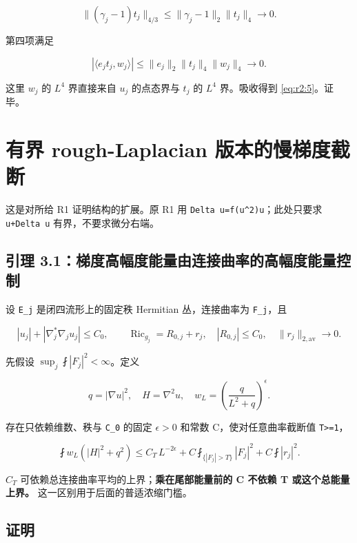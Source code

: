 \documentclass[UTF8,11pt,fontset=none]{ctexart}
\begin{document}
\[
 \|(\gamma_j-1)t_j\|_{4/3}
 \le\|\gamma_j-1\|_2\|t_j\|_4\to0.
\]

第四项满足

\[
 |\langle e_jt_j,w_j\rangle|
 \le\|e_j\|_2\|t_j\|_4\|w_j\|_4\to0.
\]

这里 \(w_j\) 的 \(L^4\) 界直接来自 \(u_j\) 的点态界与 \(t_j\) 的 \(L^4\) 界。吸收得到 \eqref{eq:r2:5}。证毕。

\section{有界 rough-Laplacian 版本的慢梯度截断}\label{ch2:ux6709ux754c-rough-laplacian-ux7248ux672cux7684ux6162ux68afux5ea6ux622aux65ad}

这是对所给 R1 证明结构的扩展。原 R1 用 \texttt{Delta\ u=f(\textbar{}u\textbar{}\^{}2)u}；此处只要求 \texttt{\textbar{}u\textbar{}+\textbar{}Delta\ u\textbar{}} 有界，不要求微分右端。

\subsection{引理 3.1：梯度高幅度能量由连接曲率的高幅度能量控制}\label{ch2:ux5f15ux7406-3.1ux68afux5ea6ux9ad8ux5e45ux5ea6ux80fdux91cfux7531ux8fdeux63a5ux66f2ux7387ux7684ux9ad8ux5e45ux5ea6ux80fdux91cfux63a7ux5236}

设 \texttt{E\_j} 是闭四流形上的固定秩 Hermitian 丛，连接曲率为 \texttt{F\_j}，且

\[
 |u_j|+|\nabla_j^*\nabla_j u_j|\le C_0,\qquad
 \operatorname{Ric}_{g_j}=R_{0,j}+r_j,\quad |R_{0,j}|\le C_0,\quad
 \|r_j\|_{2,\mathrm{av}}\to0.
 \tag{2.11}\label{eq:r2:11}
\]

先假设 \(\sup_j\fint|F_j|^2<\infty\)。定义

\[
 q=|\nabla u|^2,\quad H=\nabla^2u,\quad
 w_L=\left(\frac q{L^2+q}\right)^\epsilon.
\]

存在只依赖维数、秩与 \texttt{C\_0} 的固定 \(\epsilon>0\) 和常数 C，使对任意曲率截断值 \texttt{T\textgreater{}=1}，

\[
 \boxed{
 \fint w_L(|H|^2+q^2)
 \le C_T\,L^{-2\epsilon}
 +C\fint_{\{|F_j|>T\}}|F_j|^2
 +C\fint|r_j|^2.}
 \tag{2.12}\label{eq:r2:12}
\]

\(C_T\) 可依赖总连接曲率平均的上界；\textbf{乘在尾部能量前的 C 不依赖 T 或这个总能量上界。} 这一区别用于后面的普适浓缩门槛。

\subsection{证明}\label{ch2:ux8bc1ux660e-1}
\end{document}
